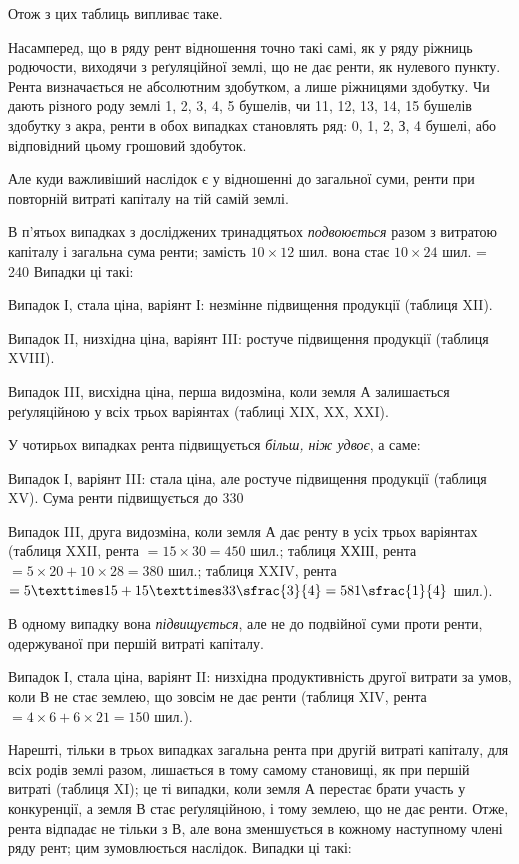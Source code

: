 

Отож з цих таблиць випливає таке.

Насамперед, що в ряду рент відношення точно такі самі, як у ряду ріжниць
родючости, виходячи з реґуляційної землі, що не дає ренти, як нулевого
пункту. Рента визначається не абсолютним здобутком, а лише ріжницями здобутку.
Чи дають різного роду землі 1, 2, 3, 4, 5 бушелів, чи 11, 12, 13, 14,
15 бушелів здобутку з акра, ренти в обох випадках становлять ряд: 0, 1, 2,
З, 4 бушелі, або відповідний цьому грошовий здобуток.

Але куди важливіший наслідок є у відношенні до загальної суми, ренти
при повторній витраті капіталу на тій самій землі.

В п’ятьох випадках з досліджених тринадцятьох \emph{подвоюється} разом з витратою
капіталу і загальна сума ренти; замість $10 × 12$ шил. вона стає
$10 × 24$ шил. = 240 Випадки ці такі:

Випадок І, стала ціна, варіянт І: незмінне підвищення продукції (таблиця
XII).

Випадок II, низхідна ціна, варіянт III: ростуче підвищення продукції
(таблиця XVIII).

Випадок III, висхідна ціна, перша видозміна, коли земля А залишається
реґуляційною у всіх трьох варіянтах (таблиці XIX, XX, XXI).

У чотирьох випадках рента підвищується \emph{більш, ніж удвоє}, а саме:

Випадок І, варіянт III: стала ціна, але ростуче підвищення продукції
(таблиця XV). Сума ренти підвищується до 330

Випадок III, друга видозміна, коли земля А дає ренту в усіх трьох варіянтах
(таблиця XXII, рента $= 15 × 30 = 450$ шил.; таблиця ХХІІІ, рента $= 5 ×
20 + 10 × 28 = 380$ шил.; таблиця XXIV, рента
$= 5 × 15 + 15 × 33\sfrac{3}{4} = 581\sfrac{1}{4}$ шил.).

В одному випадку вона \emph{підвищується}, але не до подвійної суми проти
ренти, одержуваної при першій витраті капіталу.

Випадок І, стала ціна, варіянт II: низхідна продуктивність другої витрати
за умов, коли В не стає землею, що зовсім не дає ренти (таблиця XIV, рента
$= 4 × 6 + 6 × 21 = 150$ шил.).

Нарешті, тільки в трьох випадках загальна рента при другій витраті
капіталу, для всіх родів землі разом, лишається в тому самому становищі, як при
першій витраті (таблиця XI); це ті випадки, коли земля $А$ перестає брати участь
у конкуренції, а земля В стає реґуляційною, і тому землею, що не дає ренти.
Отже, рента відпадає не тільки з В, але вона зменшується в кожному наступному
члені ряду рент; цим зумовлюється наслідок. Випадки ці такі:

